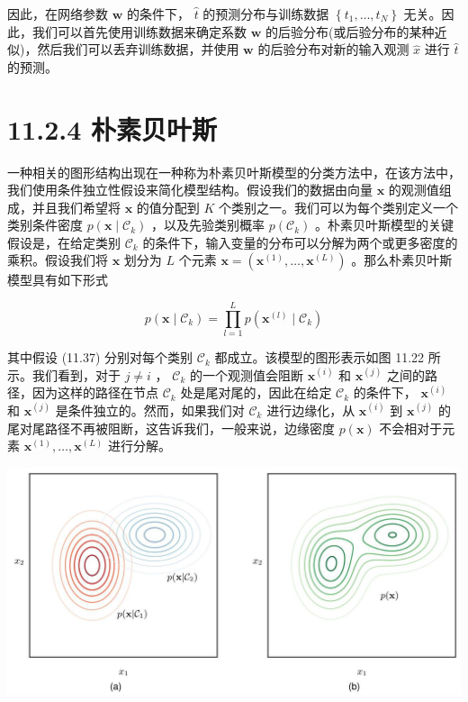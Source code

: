 \documentclass[10pt]{article}
\begin{document}
因此，在网络参数 \(\mathbf{w}\) 的条件下， \(\widehat{t}\) 的预测分布与训练数据 \(\left\{  {{t}_{1},\ldots ,{t}_{N}}\right\}\) 无关。因此，我们可以首先使用训练数据来确定系数 \(\mathbf{w}\) 的后验分布(或后验分布的某种近似)，然后我们可以丢弃训练数据，并使用 \(\mathbf{w}\) 的后验分布对新的输入观测 \(\widehat{x}\) 进行 \(\widehat{t}\) 的预测。

\section*{11.2.4 朴素贝叶斯}

一种相关的图形结构出现在一种称为朴素贝叶斯模型的分类方法中，在该方法中，我们使用条件独立性假设来简化模型结构。假设我们的数据由向量 \(\mathbf{x}\) 的观测值组成，并且我们希望将 \(\mathbf{x}\) 的值分配到 \(K\) 个类别之一。我们可以为每个类别定义一个类别条件密度 \(p\left( {\mathbf{x} \mid  {\mathcal{C}}_{k}}\right)\) ，以及先验类别概率 \(p\left( {\mathcal{C}}_{k}\right)\) 。朴素贝叶斯模型的关键假设是，在给定类别 \({\mathcal{C}}_{k}\) 的条件下，输入变量的分布可以分解为两个或更多密度的乘积。假设我们将 \(\mathbf{x}\) 划分为 \(L\) 个元素 \(\mathbf{x} = \left( {{\mathbf{x}}^{\left( 1\right) },\ldots ,{\mathbf{x}}^{\left( L\right) }}\right)\) 。那么朴素贝叶斯模型具有如下形式

\[
p\left( {\mathbf{x} \mid  {\mathcal{C}}_{k}}\right)  = \mathop{\prod }\limits_{{l = 1}}^{L}p\left( {{\mathbf{x}}^{\left( l\right) } \mid  {\mathcal{C}}_{k}}\right)  \tag{11.37}
\]

其中假设 (11.37) 分别对每个类别 \({\mathcal{C}}_{k}\) 都成立。该模型的图形表示如图 11.22 所示。我们看到，对于 \(j \neq  i\) ， \({\mathcal{C}}_{k}\) 的一个观测值会阻断 \({\mathbf{x}}^{\left( i\right) }\) 和 \({\mathbf{x}}^{\left( j\right) }\) 之间的路径，因为这样的路径在节点 \({\mathcal{C}}_{k}\) 处是尾对尾的，因此在给定 \({\mathcal{C}}_{k}\) 的条件下， \({\mathbf{x}}^{\left( i\right) }\) 和 \({\mathbf{x}}^{\left( j\right) }\) 是条件独立的。然而，如果我们对 \({\mathcal{C}}_{k}\) 进行边缘化，从 \({\mathbf{x}}^{\left( i\right) }\) 到 \({\mathbf{x}}^{\left( j\right) }\) 的尾对尾路径不再被阻断，这告诉我们，一般来说，边缘密度 \(p\left( \mathbf{x}\right)\) 不会相对于元素 \({\mathbf{x}}^{\left( 1\right) },\ldots ,{\mathbf{x}}^{\left( L\right) }\) 进行分解。

\begin{center}
\includegraphics[max width=1.0\textwidth]{images/0194e279-9b28-703a-88f4-c3ac21e2010d_364_236_342_1308_656_0.jpg}
\end{center}
\hspace*{3em} 
\end{document}
